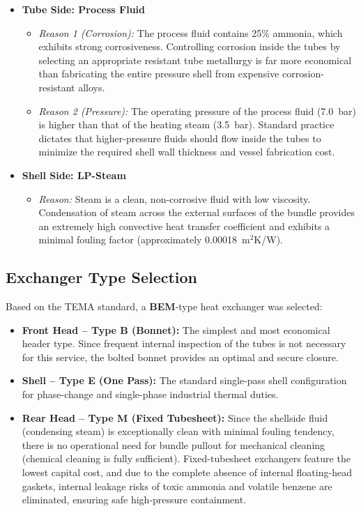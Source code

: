 \documentclass[12pt]{article}
\begin{document}
\begin{itemize}
\item \textbf{Tube Side: Process Fluid}
\begin{itemize}
\item \textit{Reason 1 (Corrosion):} The process fluid contains 25\% ammonia, which exhibits strong corrosiveness. Controlling corrosion inside the tubes by selecting an appropriate resistant tube metallurgy is far more economical than fabricating the entire pressure shell from expensive corrosion-resistant alloys.
\item \textit{Reason 2 (Pressure):} The operating pressure of the process fluid (7.0~bar) is higher than that of the heating steam (3.5~bar). Standard practice dictates that higher-pressure fluids should flow inside the tubes to minimize the required shell wall thickness and vessel fabrication cost.
\end{itemize}
\item \textbf{Shell Side: LP-Steam}
\begin{itemize}
\item \textit{Reason:} Steam is a clean, non-corrosive fluid with low viscosity. Condensation of steam across the external surfaces of the bundle provides an extremely high convective heat transfer coefficient and exhibits a minimal fouling factor (approximately 0.00018~m$^2$K/W).
\end{itemize}
\end{itemize}

\subsection{Exchanger Type Selection}

Based on the TEMA standard, a \textbf{BEM}-type heat exchanger was selected:

\begin{itemize}
\item \textbf{Front Head -- Type B (Bonnet):} The simplest and most economical header type. Since frequent internal inspection of the tubes is not necessary for this service, the bolted bonnet provides an optimal and secure closure.
\item \textbf{Shell -- Type E (One Pass):} The standard single-pass shell configuration for phase-change and single-phase industrial thermal duties.
\item \textbf{Rear Head -- Type M (Fixed Tubesheet):} Since the shellside fluid (condensing steam) is exceptionally clean with minimal fouling tendency, there is no operational need for bundle pullout for mechanical cleaning (chemical cleaning is fully sufficient). Fixed-tubesheet exchangers feature the lowest capital cost, and due to the complete absence of internal floating-head gaskets, internal leakage risks of toxic ammonia and volatile benzene are eliminated, ensuring safe high-pressure containment.
\end{itemize}
\end{document}
